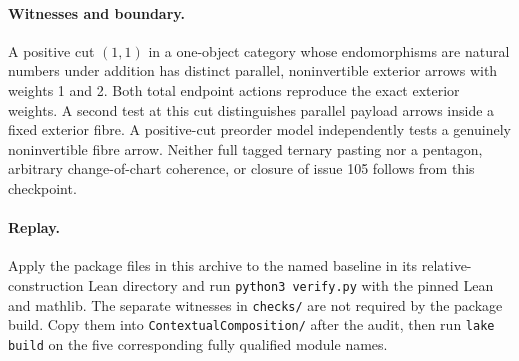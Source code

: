 \paragraph{Witnesses and boundary.} A positive cut $(1,1)$ in a one-object
category whose endomorphisms are natural numbers under addition has distinct
parallel, noninvertible exterior arrows with weights 1 and 2. Both total
endpoint actions reproduce the exact exterior weights. A second test at this
cut distinguishes parallel payload arrows inside a fixed exterior fibre.
A positive-cut preorder model independently tests a genuinely noninvertible
fibre arrow. Neither full tagged ternary pasting nor a pentagon, arbitrary
change-of-chart coherence, or closure of issue 105 follows from this checkpoint.

\paragraph{Replay.} Apply the package files in this archive to the named
baseline in its relative-construction Lean directory and run
\texttt{python3 verify.py} with the pinned Lean and mathlib. The separate
witnesses in \texttt{checks/} are not required by the package build.
Copy them into \texttt{ContextualComposition/} after the audit, then run
\texttt{lake build} on the five corresponding fully qualified module names.
